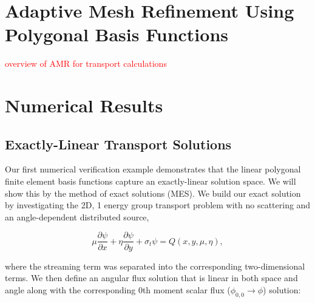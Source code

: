 \documentclass[preprint,10pt]{elsarticle}
\newcommand{\tcr}[1]{\textcolor{red}{#1}}
\begin{document}
\section{Adaptive Mesh Refinement Using Polygonal Basis Functions} \label{sec::amr}

\tcr{overview of AMR for transport calculations}

\iffalse
\section{Numerical Results} \label{sec::results}

\subsection{Exactly-Linear Transport Solutions}

Our first numerical verification example demonstrates that the linear polygonal finite element basis functions capture an exactly-linear solution space. We will show this by the method of exact solutions (MES). We build our exact solution by investigating the 2D, 1 energy group transport problem with no scattering and an angle-dependent distributed source,

\begin{equation}
\label{eq::Results_Linear_angflux}
\mu \frac{\partial \psi}{\partial x} + \eta \frac{\partial \psi}{\partial y} + \sigma_t \psi = Q(x,y, \mu, \eta), 
\end{equation}

\noindent where the streaming term was separated into the corresponding two-dimensional terms. We then define an angular flux solution that is linear in both space and angle along with the corresponding 0th moment scalar flux ($\phi_{0,0} \rightarrow \phi$) solution:
\end{document}
